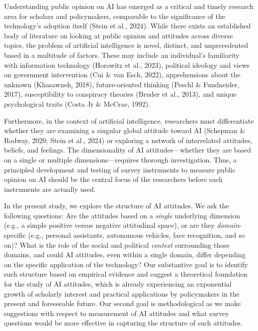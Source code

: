 Understanding public opinion on AI has emerged as a critical and timely research area for scholars and policymakers, comparable to the significance of the technology's adoption itself (Stein et al., 2024). While there exists an established body of literature on looking at public opinion and attitudes across diverse topics, the problem of artificial intelligence is novel, distinct, and unprecedented based in a multitude of factors. These may include an individual's familiarity with information technology (Horowitz et al., 2023), political ideology and views on government intervention (Cui \& van Esch, 2022), apprehensions about the unknown (Khasawneh, 2018), future-oriented thinking (Peschl \& Fundneider, 2017), susceptibility to conspiracy theories (Bruder et al., 2013), and unique psychological traits (Costa Jr \& McCrae, 1992).

Furthermore, in the context of artificial intelligence, researchers must differentiate whether they are examining a singular global attitude toward AI (Schepman \& Rodway, 2020; Stein et al., 2024) or exploring a network of interrelated attitudes, beliefs, and feelings. The dimensionality of AI attitudes—whether they are based on a single or multiple dimensions—requires thorough investigation. Thus, a principled development and testing of survey instruments to measure public opinion on AI should be the central focus of the researchers before such instruments are actually used.

In the present study, we explore the structure of AI attitudes. We ask the following questions: Are the attitudes based on a \textit{single} underlying dimension (e.g., a simple positive versus negative attitudinal space), or are they \textit{domain}-specific (e.g., personal assistants, autonomous vehicles, face recognition, and so on)? What is the role of the social and political \textit{context} surrounding those domains, and could AI attitudes, even within a single domain, differ depending on the specific application of the technology? Our substantive goal is to identify such structure based on empirical evidence and suggest a theoretical foundation for the study of AI attitudes, which is already experiencing an exponential growth of scholarly interest and practical applications by policymakers in the present and foreseeable future. Our second goal is methodological as we make suggestions with respect to measurement of AI attitudes and what survey questions would be more effective in capturing the structure of such attitudes.

